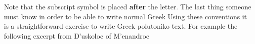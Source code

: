\begin{multicols}{2}
Note that the subscript symbol is placed \textbf{after} the letter.
The last thing someone must know in order to be able to write normal Greek
Using these conventions it is a straightforward exercise to write Greek
\textgreek{polutoniko} text. For example the following excerpt from 
\textgreek{D'uskoloc} of \textgreek{M'enandroc}

\end{multicols}
